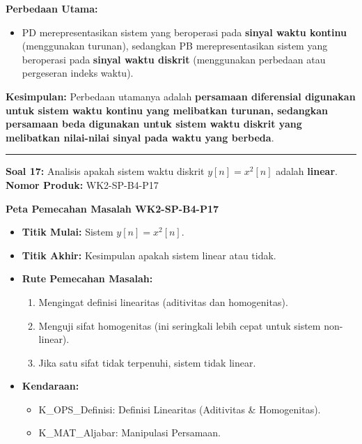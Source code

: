\documentclass[
  letterpaper,
  DIV=11,
  numbers=noendperiod]{scrreprt}
\providecommand{\tightlist}{%
  \setlength{\itemsep}{0pt}\setlength{\parskip}{0pt}}
\begin{document}
\textbf{Perbedaan Utama:}

\begin{itemize}
\tightlist
\item
  PD merepresentasikan sistem yang beroperasi pada \textbf{sinyal waktu
  kontinu} (menggunakan turunan), sedangkan PB merepresentasikan sistem
  yang beroperasi pada \textbf{sinyal waktu diskrit} (menggunakan
  perbedaan atau pergeseran indeks waktu).
\end{itemize}

\textbf{Kesimpulan:} Perbedaan utamanya adalah \textbf{persamaan
diferensial digunakan untuk sistem waktu kontinu yang melibatkan
turunan, sedangkan persamaan beda digunakan untuk sistem waktu diskrit
yang melibatkan nilai-nilai sinyal pada waktu yang berbeda}.

\begin{center}\rule{0.5\linewidth}{0.5pt}\end{center}

\textbf{Soal 17:} Analisis apakah sistem waktu diskrit \(y[n] = x^2[n]\)
adalah \textbf{linear}. \textbf{Nomor Produk:} WK2-SP-B4-P17

\textbf{Peta Pemecahan Masalah WK2-SP-B4-P17}

\begin{itemize}
\tightlist
\item
  \textbf{Titik Mulai:} Sistem \(y[n] = x^2[n]\).
\item
  \textbf{Titik Akhir:} Kesimpulan apakah sistem linear atau tidak.
\item
  \textbf{Rute Pemecahan Masalah:}

  \begin{enumerate}
  \def\labelenumi{\arabic{enumi}.}
  \tightlist
  \item
    Mengingat definisi linearitas (aditivitas dan homogenitas).
  \item
    Menguji sifat homogenitas (ini seringkali lebih cepat untuk sistem
    non-linear).
  \item
    Jika satu sifat tidak terpenuhi, sistem tidak linear.
  \end{enumerate}
\item
  \textbf{Kendaraan:}

  \begin{itemize}
  \tightlist
  \item
    K\_OPS\_Definisi: Definisi Linearitas (Aditivitas \& Homogenitas).
  \item
    K\_MAT\_Aljabar: Manipulasi Persamaan.
  \end{itemize}
\end{itemize}
\end{document}
